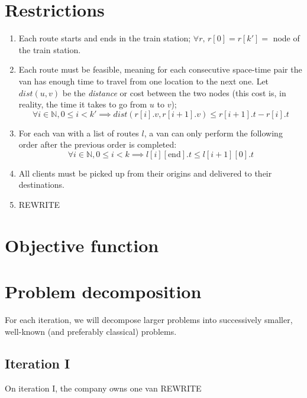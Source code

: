 \section{Restrictions}
\begin{enumerate}
    \item Each route starts and ends in the train station; $\forall r,\,r[0]=r[k']=$ node of the train station.
    \item Each route must be feasible, meaning for each consecutive space-time pair the van has enough time to travel from one location to the next one. Let $dist(u, v)$ be the \emph{distance} or cost between the two nodes (this cost is, in reality, the time it takes to go from $u$ to $v$);
    \begin{equation*}
        \forall i \in \mathbb{N}, 0 \leq i < k' \implies dist(r[i].v, r[i+1].v) \leq r[i+1].t-r[i].t
    \end{equation*}
    \item For each van with a list of routes $l$, a van can only perform the following order after the previous order is completed:
    \begin{equation*}
        \forall i \in \mathbb{N}, 0 \leq i < k \implies l[i][\text{end}].t \leq l[i+1][0].t
    \end{equation*}
    \item All clients must be picked up from their origins and delivered to their destinations.
    \item REWRITE
\end{enumerate}
\section{Objective function}
\section{Problem decomposition}
For each iteration, we will decompose larger problems into successively smaller, well-known (and preferably classical) problems.
\subsection{Iteration I}
On iteration I, the company owns one van REWRITE
